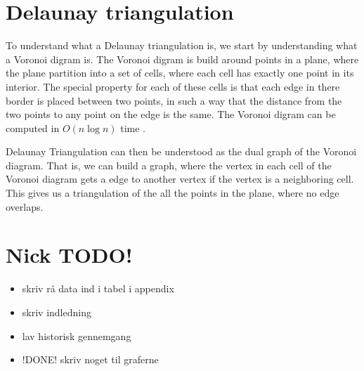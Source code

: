 \chapter{Delaunay triangulation}\label{appendix:delaunaykruskal}

To understand what a Delaunay triangulation is, we start by understanding what a 
Voronoi digram is. The Voronoi digram is build around points in a plane, where 
the plane partition into a set of cells, where each cell has exactly one point 
in its interior. The special property for each of these cells is that each edge 
in there border is placed between two points, in such a way that the distance 
from the two points to any point on the edge is the same. The Voronoi digram can 
be computed in $O(n \log n)$ time \cite{CompGeo}. 

Delaunay Triangulation can then be understood as the dual graph of the Voronoi 
diagram. That is, we can build a graph, where the vertex in each cell of the 
Voronoi diagram gets a edge to another vertex if the vertex is a neighboring 
cell. This gives us a triangulation of the all the points in the plane, where
no edge overlaps.


\chapter{Nick TODO!}
\begin{itemize}
	\item skriv rå data ind i tabel i appendix
	\item skriv indledning
	\item lav historisk gennemgang
	\item !DONE! skriv noget til graferne
\end{itemize}
